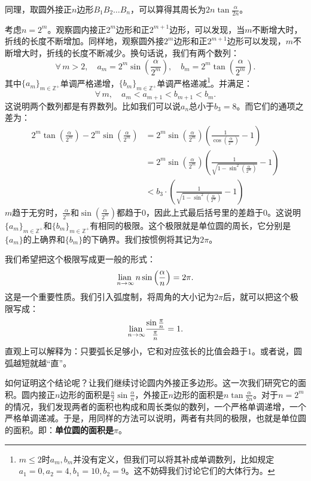 \documentclass[12pt,UTF8,fontset=none]{ctexbook}
\begin{document}
同理，取圆外接正$n$边形$B_1B_2\ldots B_n$，可以算得其周长为$2n\tan{\frac{\alpha}{2n}}$。

考虑$n=2^m$。观察圆内接正$2^m$边形和正$2^{m+1}$边形，可以发现，当$m$不断增大时，折线的长度不断增加。同样地，观察圆外接$2^m$边形和正$2^{m+1}$边形可以发现，$m$不断增大时，折线的长度不断减少。换句话说，我们有两个数列：
$$ \forall \, m > 2, \quad a_m = 2^m\sin{\left(\frac{\alpha}{2^m}\right)}, \quad b_m = 2^{m}\tan{\left(\frac{\alpha}{2^m}\right)}. $$
其中$\{a_m\}_{m\in\mathbb{Z}^+}$单调严格递增，$\{b_m\}_{m\in\mathbb{Z}^+}$单调严格递减\footnote{$m\leqslant 2$时$a_m,b_m$并没有定义，但我们可以将其补成单调数列，比如规定$a_1=0,a_2=4,b_1=10,b_2=9$。这不妨碍我们讨论它们的大体行为。}。并满足：
$$ \forall \, m, \quad a_m < a_{m+1} < b_{m+1} < b_m.$$
这说明两个数列都是有界数列。比如我们可以说$a_n$总小于$b_3 = 8$。而它们的通项之差为：
\begin{align*}
    2^{m}\tan{\left(\frac{\alpha}{2^m}\right)} - 2^m\sin{\left(\frac{\alpha}{2^m}\right)} &= 2^m\sin{\left(\frac{\alpha}{2^m}\right)}\left(\frac{1}{\cos{\left(\frac{\alpha}{2^m}\right)}} - 1\right) \\
    &= 2^m\sin{\left(\frac{\alpha}{2^m}\right)}\left(\frac{1}{\sqrt{1 - \sin^2{\left(\frac{\alpha}{2^m}\right)}}} - 1\right) \\
    &< b_3 \cdot \left(\frac{1}{\sqrt{1 - \sin^2{\left(\frac{\alpha}{2^m}\right)}}} - 1\right)
\end{align*}
$m$趋于无穷时，$\frac{\alpha}{2^m}$和$\sin{\left(\frac{\alpha}{2^m}\right)}$都趋于$0$，因此上式最后括号里的差趋于$0$。这说明$\{a_m\}_{m\in\mathbb{Z}^+}$和$\{b_m\}_{m\in\mathbb{Z}^+}$有相同的极限。这个极限就是单位圆的周长，它分别是$\{a_m\}$的上确界和$\{b_m\}$的下确界。我们按惯例将其记为$2\pi$。

我们希望把这个极限写成更一般的形式：
$$ \underset{n\to\infty}{\operatorname{lian}\,}\, n\sin{\left(\frac{\alpha}{n}\right)} = 2\pi.$$
这是一个重要性质。我们引入弧度制，将周角的大小记为$2\pi$后，就可以把这个极限写成：
$$ \underset{n\to\infty}{\operatorname{lian}\,} \frac{\sin{\frac{\pi}{n}}}{\frac{\pi}{n}} = 1. $$
直观上可以解释为：只要弧长足够小，它和对应弦长的比值会趋于$1$。或者说，圆弧越短就越“直”。

如何证明这个结论呢？让我们继续讨论圆内外接正多边形。这一次我们研究它的面积。圆内接正$n$边形的面积是$\frac{n}{2}\sin{\frac{\alpha}{n}}$，外接正$n$边形的面积是$n\tan{\frac{\alpha}{2n}}$。对于$n=2^m$的情况，我们发现两者的面积也构成和周长类似的数列，一个严格单调递增，一个严格单调递减。于是，用同样的方法可以说明，两者有共同的极限，也就是单位圆的面积。即：\textbf{单位圆的面积是}$\pi$。
\end{document}
